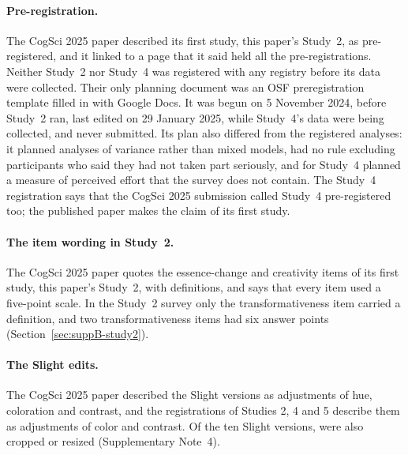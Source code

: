\paragraph*{Pre-registration.}
The CogSci 2025 paper described its first study, this paper's Study~2, as pre-registered, and it linked to a page that it said held all the pre-registrations. Neither Study~2 nor Study~4 was registered with any registry before its data were collected. Their only planning document was an OSF preregistration template filled in with Google Docs. It was begun on 5 November 2024, before Study~2 ran, last edited on 29 January 2025, while Study~4's data were being collected, and never submitted. Its plan also differed from the registered analyses: it planned analyses of variance rather than mixed models, had no rule excluding participants who said they had not taken part seriously, and for Study~4 planned a measure of perceived effort that the survey does not contain. The Study~4 registration says that the CogSci 2025 submission called Study~4 pre-registered too; the published paper makes the claim of its first study.

\paragraph*{The item wording in Study~2.}
The CogSci 2025 paper quotes the essence-change and creativity items of its first study, this paper's Study~2, with definitions, and says that every item used a five-point scale. In the Study~2 survey only the transformativeness item carried a definition, and two transformativeness items had six answer points (Section~\ref{sec:suppB-study2}).

\paragraph*{The Slight edits.}
The CogSci 2025 paper described the Slight versions as adjustments of hue, coloration and contrast, and the registrations of Studies 2, 4 and 5 describe them as adjustments of color and contrast. Of the ten Slight versions, \XSImageCheckSlightReframedN{} were also cropped or resized (Supplementary Note~4).


